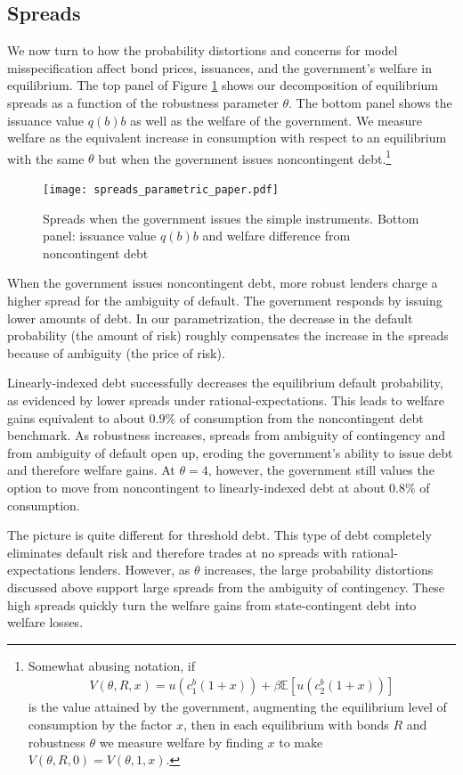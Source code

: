 \subsection{Spreads}\label{sec:spreads}
We now turn to how the probability distortions and concerns for model misspecification affect bond prices, issuances, and the government's welfare in equilibrium. The top panel of Figure \ref{Figure_spreads_parametric} shows our decomposition of equilibrium spreads as a function of the robustness parameter $\theta$. The bottom panel shows the issuance value $q(b)b$ as well as the welfare of the government. We measure welfare as the equivalent increase in consumption with respect to an equilibrium with the same $\theta$ but when the government issues noncontingent debt.\footnote{Somewhat abusing notation, if
\begin{align*}
  V(\theta, R, x) = u\left(c_1^b(1+x)\right) + \beta \mathbb{E}\left[u\left(c_2^b(1+x)\right)\right]
\end{align*}
is the value attained by the government, augmenting the equilibrium level of consumption by the factor $x$, then in each equilibrium with bonds $R$ and robustness $\theta$ we measure welfare by finding $x$ to make $V(\theta, R, 0) = V(\theta, 1, x)$.}
\begin{figure}[!hbtp]\centering
    \texttt{[image: spreads\_parametric\_paper.pdf]}
\caption{Spreads when the government issues the simple instruments. Bottom panel: issuance value $q(b)b$ and welfare difference from noncontingent debt}\label{Figure_spreads_parametric}
\end{figure}

When the government issues noncontingent debt, more robust lenders charge a higher spread for the ambiguity of default. The government responds by issuing lower amounts of debt. In our parametrization, the decrease in the default probability (the amount of risk) roughly compensates the increase in the spreads because of ambiguity (the price of risk).

Linearly-indexed debt successfully decreases the equilibrium default probability, as evidenced by lower spreads under rational-expectations. This leads to welfare gains equivalent to about $0.9\%$ of consumption from the noncontingent debt benchmark. As robustness increases, spreads from ambiguity of contingency and from ambiguity of default open up, eroding the government's ability to issue debt and therefore welfare gains. At $\theta = 4$, however, the government still values the option to move from noncontingent to linearly-indexed debt at about $0.8\%$ of consumption.

The picture is quite different for threshold debt. This type of debt completely eliminates default risk and therefore trades at no spreads with rational-expectations lenders. However, as $\theta$ increases, the large probability distortions discussed above support large spreads from the ambiguity of contingency. These high spreads quickly turn the welfare gains from state-contingent debt into welfare losses.

